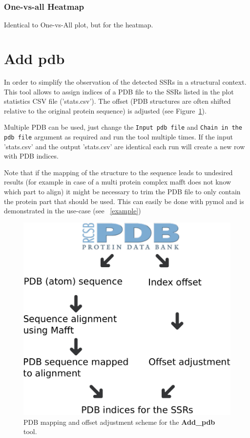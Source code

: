 \documentclass[a4paper,10pt]{article}
\begin{document}
\subsubsection{One-vs-all Heatmap}

Identical to One-vs-All plot, but for the heatmap.

\section{Add pdb} \label{add_p}

In order to simplify the observation of the detected SSRs in a structural context. This tool allows to assign
indices of a PDB file to the SSRs listed in the plot statistics CSV file ('stats.csv'). 
The offset (PDB structures are often shifted relative to
the original protein sequence) is adjusted (see Figure~\ref{fig:pdb_mapping}).  

Multiple PDB can be used, just change the \texttt{Input pdb file} and \texttt{Chain in the pdb file} argument as 
required and run the tool multiple times. If the input 'stats.csv' and the output 'stats.csv' are identical each run
will create a new row with PDB indices.

Note that if the mapping of the structure to the sequence leads to undesired results (for example
in case of a multi protein complex mafft does not know which part to align) it might be necessary to trim the 
PDB file to only contain the protein part that should be used. This can easily be done with pymol and is 
demonstrated in the use-case (see ~\ref{example})

\begin{figure}
  \includegraphics[width=\linewidth]{./figs/pdb_mapping}
  \caption{PDB mapping and offset adjustment scheme for the \textbf{Add\_pdb} tool.}
  \label{fig:pdb_mapping}
\end{figure}
\end{document}
